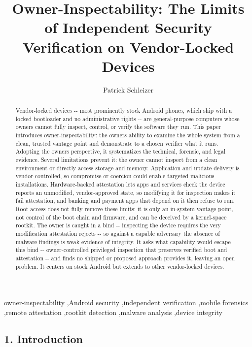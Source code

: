 \documentclass[
  preprint,
  review]{elsarticle}
\author{}
\date{}
\begin{document}
\begin{frontmatter}
\title{Owner-Inspectability: The Limits of Independent Security Verification on
Vendor-Locked Devices}
\author{Patrick Schleizer}
\begin{abstract}
Vendor-locked devices -\/- most prominently stock Android phones, which
ship with a locked bootloader and no administrative rights -\/- are
general-purpose computers whose owners cannot fully inspect, control, or
verify the software they run. This paper introduces
owner-inspectability: the owner\textquotesingle s ability to examine the
whole system from a clean, trusted vantage point and demonstrate to a
chosen verifier what it runs. Adopting the owner\textquotesingle s
perspective, it systematizes the technical, forensic, and legal
evidence. Several limitations prevent it: the owner cannot inspect from
a clean environment or directly access storage and memory. Application
and update delivery is vendor-controlled, so compromise or coercion
could enable targeted malicious installations. Hardware-backed
attestation lets apps and services check the device reports an
unmodified, vendor-approved state, so modifying it for inspection makes
it fail attestation, and banking and payment apps that depend on it then
refuse to run. Root access does not fully remove these limits: it is
only an in-system vantage point, not control of the boot chain and
firmware, and can be deceived by a kernel-space rootkit. The owner is
caught in a bind -\/- inspecting the device requires the very
modification attestation rejects -\/- so against a capable adversary the
absence of malware findings is weak evidence of integrity. It asks what
capability would escape this bind -\/- owner-controlled privileged
inspection that preserves verified boot and attestation -\/- and finds
no shipped or proposed approach provides it, leaving an open problem. It
centers on stock Android but extends to other vendor-locked devices.
\end{abstract}
\begin{keyword}
owner-inspectability \sep Android security \sep independent verification \sep mobile forensics \sep remote attestation \sep rootkit detection \sep malware analysis \sep device integrity
\end{keyword}
\end{frontmatter}

\subsection{1. Introduction}\label{introduction}
\end{document}

